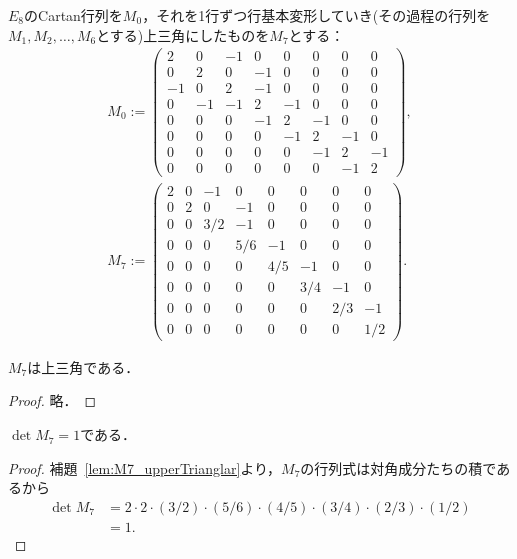 \begin{definition}
  \label{def:M0-M7}
  \leanok
  $E_8$のCartan行列を$M_0$，それを1行ずつ行基本変形していき(その過程の行列を$M_1, M_2, \ldots, M_6$とする)上三角にしたものを$M_7$とする：
  \begin{gather}
    M_0 :=
    \begin{pmatrix}
      2 & 0 & -1 & 0 & 0 & 0 & 0 & 0 \\
      0 & 2 & 0 & -1 & 0 & 0 & 0 & 0 \\
      -1 & 0 & 2 & -1 & 0 & 0 & 0 & 0 \\
      0 & -1 & -1 & 2 & -1 & 0 & 0 & 0 \\
      0 & 0 & 0 & -1 & 2 & -1 & 0 & 0 \\
      0 & 0 & 0 & 0 & -1 & 2 & -1 & 0 \\
      0 & 0 & 0 & 0 & 0 & -1 & 2 & -1 \\
      0 & 0 & 0 & 0 & 0 & 0 & -1 & 2
    \end{pmatrix},\\
    M_7 :=
    \begin{pmatrix}
      2 & 0 & -1 & 0 & 0 & 0 & 0 & 0 \\
      0 & 2 & 0 & -1 & 0 & 0 & 0 & 0 \\
      0 & 0 & 3/2 & -1 & 0 & 0 & 0 & 0 \\
      0 & 0 & 0 & 5/6 & -1 & 0 & 0 & 0 \\
      0 & 0 & 0 & 0 & 4/5 & -1 & 0 & 0 \\
      0 & 0 & 0 & 0 & 0 & 3/4 & -1 & 0 \\
      0 & 0 & 0 & 0 & 0 & 0 & 2/3 & -1 \\
      0 & 0 & 0 & 0 & 0 & 0 & 0 & 1/2
    \end{pmatrix}.
  \end{gather}
\end{definition}

\begin{lemma}
  \label{lem:M7_upperTrianglar}
  \leanok
  $M_7$は上三角である．
\end{lemma}

\begin{proof}
  \leanok
  略．
\end{proof}

\begin{lemma}
  \label{lem:M7_det}
  \leanok
  $\det M_7 = 1$である．
\end{lemma}

\begin{proof}
  \leanok
  補題~\ref{lem:M7_upperTrianglar}より，$M_7$の行列式は対角成分たちの積であるから
  \begin{align}
    \det M_7
    &= 2 \cdot 2 \cdot (3 / 2) \cdot (5 / 6) \cdot (4 / 5) \cdot (3 / 4) \cdot (2 / 3) \cdot (1 / 2)\\
    &= 1.
  \end{align}
\end{proof}

